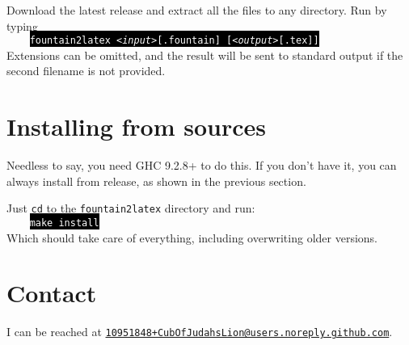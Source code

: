 \documentclass[11pt]{article}
\newcommand{\link}[2]{\textcolor{Blue}{\href{#1}{#2}}}
\begin{document}
Download the latest release and extract all the files to any directory.
Run by typing\\

\verb|    |\colorbox{Black}{\textcolor{White}{\texttt{fountain2latex \emph{<input>}[.fountain] [\emph{<output>}[.tex]]}}}\\

Extensions can be omitted, and the result will be sent to standard
output if the second filename is not provided.


\section*{Installing from sources}

Needless to say, you need GHC 9.2.8+ to do this. If you don't have it,
you can always install from release, as shown in the previous section.

Just \texttt{cd} to the \texttt{fountain2latex} directory and run:\\

\verb|    |\colorbox{Black}{\textcolor{White}{\texttt{make install}}}\\

Which should take care of everything, including overwriting older
versions.


\section*{Contact}

I can be reached at \texttt{\link{mailto:10951848+CubOfJudahsLion@users.noreply.github.com}{10951848+CubOfJudahsLion@users.noreply.github.com}}.
\end{document}
